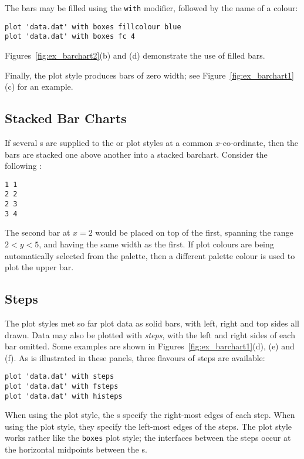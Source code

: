 The bars may be filled using the {\tt with}  modifier,
followed by the name of a colour:

\begin{verbatim}
plot 'data.dat' with boxes fillcolour blue
plot 'data.dat' with boxes fc 4
\end{verbatim}

\noindent Figures~\ref{fig:ex_barchart2}(b) and (d) demonstrate the use of
filled bars.

Finally, the  plot style produces bars of zero width; see
Figure~\ref{fig:ex_barchart1}(c) for an example.

\subsection{Stacked Bar Charts}

If several \datapoint s are supplied to the  or 
plot styles at a common $x$-co-ordinate, then the bars are stacked one above
another into a stacked barchart. Consider the following \datafile:

\begin{verbatim}
1 1
2 2
2 3
3 4
\end{verbatim}

\noindent The second bar at $x=2$ would be placed on top of the first, spanning
the range $2<y<5$, and having the same width as the first. If plot colours are
being automatically selected from the palette, then a different palette colour
is used to plot the upper bar.

\subsection{Steps}

The plot styles met so far plot data as solid bars, with left, right and top
sides all drawn. Data may also be plotted with {\it steps}, with the left and
right sides of each bar omitted. Some examples are shown in
Figures~\ref{fig:ex_barchart1}(d), (e) and (f).  As is illustrated in these
panels, three flavours of steps are available:

\begin{verbatim}
plot 'data.dat' with steps
plot 'data.dat' with fsteps
plot 'data.dat' with histeps
\end{verbatim}

\noindent When using the  plot style, the \datapoint s specify the
right-most edges of each step. When using the  plot style, they
specify the left-most edges of the steps. The  plot style works
rather like the {\tt boxes} plot style; the interfaces between the steps occur
at the horizontal midpoints between the \datapoint s.

